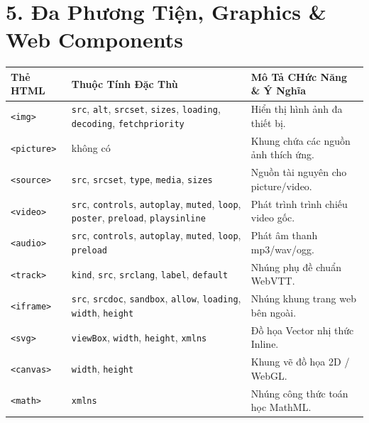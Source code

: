 \documentclass[11pt,oneside]{book}
\newcommand{\codeinline}[1]{\textcolor{accentOrange}{\texttt{#1}}}
\begin{document}
\section{5. Đa Phương Tiện, Graphics \& Web Components}

\begin{table}[H]
\centering
\begin{prettyTableBox}
\small
{}
\begin{tabularx}{\linewidth}{lp{3.5cm}X}
\rowcolor{primaryBlue}
\color{white}\textbf{Thẻ HTML} & \color{white}\textbf{Thuộc Tính Đặc Thù} & \color{white}\textbf{Mô Tả CHức Năng \& Ý Nghĩa} \\
\hline
\codeinline{<img>} & \codeinline{src}, \codeinline{alt}, \codeinline{srcset}, \codeinline{sizes}, \codeinline{loading}, \codeinline{decoding}, \codeinline{fetchpriority} & Hiển thị hình ảnh đa thiết bị. \\
\codeinline{<picture>} & không có & Khung chứa các nguồn ảnh thích ứng. \\
\codeinline{<source>} & \codeinline{src}, \codeinline{srcset}, \codeinline{type}, \codeinline{media}, \codeinline{sizes} & Nguồn tài nguyên cho picture/video. \\
\codeinline{<video>} & \codeinline{src}, \codeinline{controls}, \codeinline{autoplay}, \codeinline{muted}, \codeinline{loop}, \codeinline{poster}, \codeinline{preload}, \codeinline{playsinline} & Phát trình trình chiếu video gốc. \\
\codeinline{<audio>} & \codeinline{src}, \codeinline{controls}, \codeinline{autoplay}, \codeinline{muted}, \codeinline{loop}, \codeinline{preload} & Phát âm thanh mp3/wav/ogg. \\
\codeinline{<track>} & \codeinline{kind}, \codeinline{src}, \codeinline{srclang}, \codeinline{label}, \codeinline{default} & Nhúng phụ đề chuẩn WebVTT. \\
\codeinline{<iframe>} & \codeinline{src}, \codeinline{srcdoc}, \codeinline{sandbox}, \codeinline{allow}, \codeinline{loading}, \codeinline{width}, \codeinline{height} & Nhúng khung trang web bên ngoài. \\
\codeinline{<svg>} & \codeinline{viewBox}, \codeinline{width}, \codeinline{height}, \codeinline{xmlns} & Đồ họa Vector nhị thức Inline. \\
\codeinline{<canvas>} & \codeinline{width}, \codeinline{height} & Khung vẽ đồ họa 2D / WebGL. \\
\codeinline{<math>} & \codeinline{xmlns} & Nhúng công thức toán học MathML. \\

\end{tabularx}
\end{prettyTableBox}
\end{table}
\end{document}
